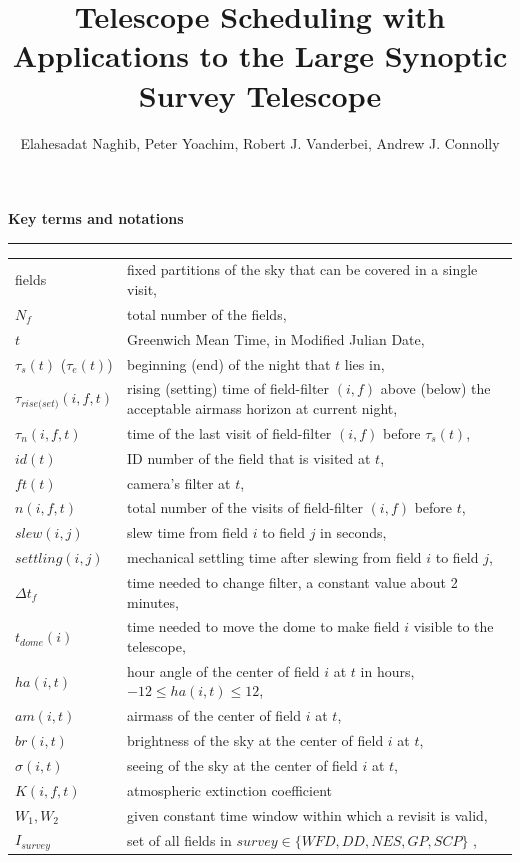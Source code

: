 \documentclass[12pt]{aastex62}
\theoremstyle{definition}
\begin{document}
\title{Telescope Scheduling with Applications to the Large Synoptic Survey Telescope}
\author{Elahesadat Naghib, Peter Yoachim, Robert J. Vanderbei, Andrew J. Connolly}


\begin{center}
\textbf{Key terms and notations}\
\noindent\rule{\textwidth}{0.4pt}
\end{center}

\begin{table}[h]
\begin{tabularx}{\textwidth}{l  X }
fields & fixed partitions of the sky that can be covered in a single visit, \\
$N_{f}$ & total number of the fields,\\
$t$& Greenwich Mean Time, in Modified Julian Date,\\ 
$\tau_s(t)$ ($\tau_e(t)$)& beginning (end) of the night that $t$ lies in,\\
$\tau_{rise\text{(}set\text{)}}(i,f,t)$ & rising (setting) time of field-filter $(i,f)$ above (below) the acceptable airmass horizon at current night,\\
$\tau_n(i,f,t)$& time of the last visit of field-filter $(i,f)$ before $\tau_s(t)$,\\
$id(t)$ & ID number of the field that is visited at $t$,\\
$ft(t)$& camera's filter at $t$,\\
$n(i,f,t)$ & total number of the visits of field-filter $(i,f)$ before $t$,\\
$slew(i,j)$& slew time from field $i$ to field $j$ in seconds,\\
$settling(i,j)$& mechanical settling time after slewing from field $i$ to field $j$,\\
$\Delta t_{f}$& time needed to change filter, a constant value about 2 minutes,\\
$t_{dome}(i)$& time needed to move the dome to make field $i$ visible to the telescope,\\
$ha(i,t)$ & hour angle of the center of field $i$ at $t$ in hours, $-12 \leq ha(i,t) \leq 12$,\\
$am(i,t)$ & airmass of the center of field $i$ at $t$,\\
$br(i,t)$ & brightness of the sky at the center of field $i$ at $t$,\\
$\sigma(i,t)$ & seeing of the sky at the center of field $i$ at $t$,\\
$K(i,f, t)$ & atmospheric extinction coefficient\\
$W_1, W_2$ & given constant time window within which a revisit is valid, \\
$I_{survey}$ & set of all fields in $survey \in \{WFD,DD,NES,GP,SCP\}$ ,\\
\end{tabularx}
\end{table}
\end{document}
